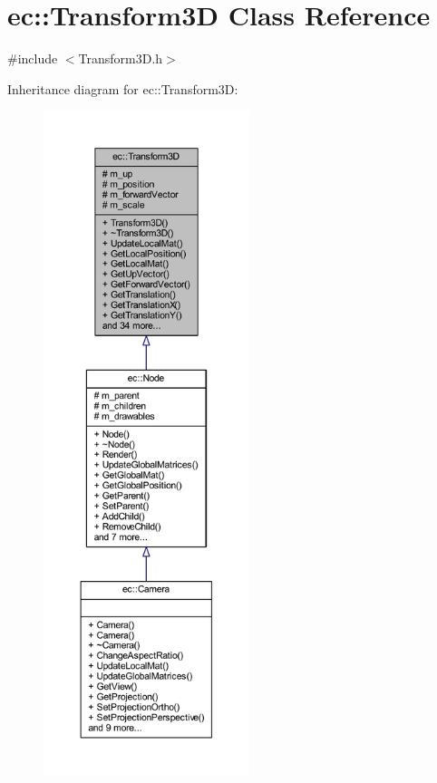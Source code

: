 \hypertarget{classec_1_1_transform3_d}{}\section{ec\+:\+:Transform3D Class Reference}
\label{classec_1_1_transform3_d}


{\ttfamily \#include $<$Transform3\+D.\+h$>$}



Inheritance diagram for ec\+:\+:Transform3D\+:
\nopagebreak
\begin{figure}[H]
\begin{center}
\leavevmode
\includegraphics[height=550pt]{classec_1_1_transform3_d__inherit__graph}
\end{center}
\end{figure}


